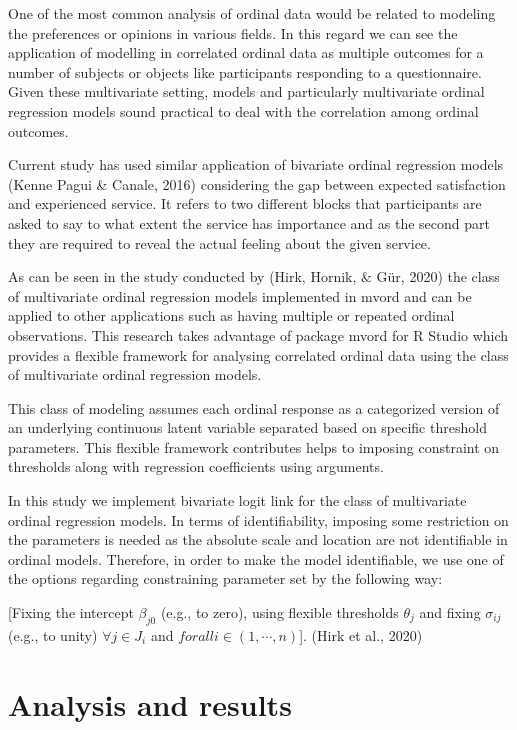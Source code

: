 \documentclass[
11pt, %
oneside, %
english, %
singlespacing, %
]{macthesis} %
\begin{document}
One of the most common analysis of ordinal data would be related to modeling the preferences or opinions in various fields. In this regard we can see the application of modelling in correlated ordinal data as multiple outcomes for a number of subjects or objects like participants responding to a questionnaire. Given these multivariate setting, models and particularly multivariate ordinal regression models sound practical to deal with the correlation among ordinal outcomes.

Current study has used similar application of bivariate ordinal regression models (Kenne Pagui \& Canale, 2016) considering the gap between expected satisfaction and experienced service. It refers to two different blocks that participants are asked to say to what extent the service has importance and as the second part they are required to reveal the actual feeling about the given service.

As can be seen in the study conducted by (Hirk, Hornik, \& Gür, 2020) the class of multivariate ordinal regression models implemented in mvord and can be applied to other applications such as having multiple or repeated ordinal observations. This research takes advantage of package mvord for R Studio which provides a flexible framework for analysing correlated ordinal data using the class of multivariate ordinal regression models.

This class of modeling assumes each ordinal response as a categorized version of an underlying continuous latent variable separated based on specific threshold parameters. This flexible framework contributes helps to imposing constraint on thresholds along with regression coefficients using arguments.

In this study we implement bivariate logit link for the class of multivariate ordinal regression models. In terms of identifiability, imposing some restriction on the parameters is needed as the absolute scale and location are not identifiable in ordinal models. Therefore, in order to make the model identifiable, we use one of the options regarding constraining parameter set by the following way:

{[}Fixing the intercept \(\beta_{j0}\) (e.g., to zero), using flexible thresholds \(\theta_j\) and fixing \(\sigma_{ij}\) (e.g., to unity) \(\forall j \in J_i\) and \(forall i \in (1, \cdots, n)\){]}.
(Hirk et al., 2020)

\hypertarget{analysis-and-results}{%
\section{Analysis and results}\label{analysis-and-results}}
\end{document}
